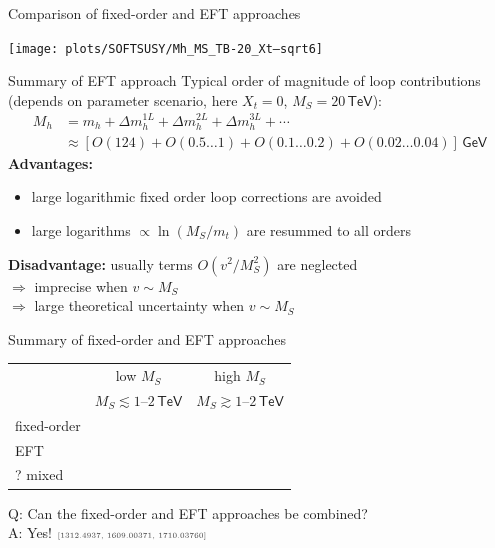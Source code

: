 \documentclass[hyperref={pdfpagelabels=false},ngerman]{beamer}
\newcommand{\cmark}{\ding{51}}%
\newcommand{\xmark}{\ding{55}}%
\newcommand{\eh}[1]{\,\mathsf{#1}}
\newcommand{\ok}{\textcolor{darkgreen}{\cmark}}
\newcommand{\notok}{\textcolor{red}{\xmark}}
\newcommand{\MS}{\ensuremath{M_S}}
\newcommand{\mycite}[1]{\ensuremath{\text{\textcolor{darkgray}{\tiny [#1]}}}}
\renewcommand{\emph}{\textbf}
\newcommand{\TeV}{\eh{TeV}}
\begin{document}
\begin{frame}{Comparison of fixed-order and EFT approaches}
  \begin{center}
    \texttt{[image: plots/SOFTSUSY/Mh\_MS\_TB-20\_Xt--sqrt6]}
  \end{center}
\end{frame}

\begin{frame}{Summary of EFT approach}
  Typical order of magnitude of loop contributions (depends on
  parameter scenario, here $X_t = 0$, $\MS = 20\eh{TeV}$):
  \begin{align*}
    M_h &= m_h + \Delta m_h^{1L} + \Delta m_h^{2L} + \Delta m_h^{3L} + \cdots \\
    &\approx [O(124) + O(0.5\ldots 1) + O(0.1\ldots 0.2) + O(0.02\ldots 0.04)] \eh{GeV}
  \end{align*}
  \emph{Advantages:}
  \begin{itemize}
  \item large logarithmic fixed order loop corrections are avoided
  \item large logarithms $\propto\ln(M_S/m_t)$ are resummed to all orders
  \end{itemize}
  \emph{Disadvantage:} usually terms $O(v^2/M_S^2)$ are neglected \\
  $\Rightarrow$ imprecise when $v \sim \MS$ \\
  $\Rightarrow$ large theoretical uncertainty when $v \sim \MS$
\end{frame}

\begin{frame}{Summary of fixed-order and EFT approaches}
  \begin{center}
    \begin{tabular}{lcc}
      \toprule
                  & low $\MS$ & high $\MS$ \\
                  & $\MS \lesssim 1$--$2\TeV$ & $\MS \gtrsim 1$--$2\TeV$ \\
      \midrule
      fixed-order & \ok       & \notok     \\
      EFT         & \notok    & \ok        \\
      ? mixed     & \ok       & \ok        \\
      \bottomrule
    \end{tabular}
  \end{center}
  \vspace{2em}
  Q: Can the fixed-order and EFT approaches be combined? \\[1em]
  A: Yes!  \mycite{1312.4937, 1609.00371, 1710.03760}
\end{frame}
\end{document}
